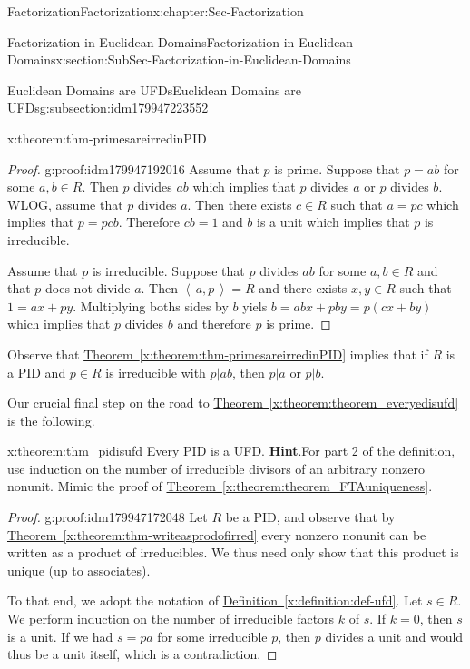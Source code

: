 \documentclass[oneside,10pt,]{book}
\newcommand{\blocktitlefont}{\relax}
\newcommand{\xreffont}{\relax}
\numberwithin{equation}{section}
\newcommand{\ideal}[1]{\left\langle\, #1 \,\right\rangle}
\begin{document}
\begin{chapterptx}{Factorization}{}{Factorization}{}{}{x:chapter:Sec-Factorization}
\begin{sectionptx}{Factorization in Euclidean Domains}{}{Factorization in Euclidean Domains}{}{}{x:section:SubSec-Factorization-in-Euclidean-Domains}
\begin{subsectionptx}{Euclidean Domains are UFDs}{}{Euclidean Domains are UFDs}{}{}{g:subsection:idm179947223552}
\begin{theorem}{}{}{x:theorem:thm-primesareirredinPID}
\end{theorem}
\begin{proof}{}{g:proof:idm179947192016}
Assume that \(p\) is prime. Suppose that \(p=ab\) for some \(a,b \in R\). Then \(p\) divides \(ab\) which implies that \(p\) divides \(a\) or \(p\) divides \(b\). WLOG, assume that \(p\) divides \(a\). Then there exists \(c\in R\) such that \(a=pc\) which implies that \(p=pcb\). Therefore \(cb=1\) and \(b\) is a unit which implies that \(p\) is irreducible.%
\par
Assume that \(p\) is irreducible. Suppose that \(p\) divides \(ab\) for some \(a,b \in R\) and that \(p\) does not divide \(a\). Then \(\ideal{a,p}=R\) and there exists \(x,y\in R\) such that \(1=ax+py\). Multiplying boths sides by \(b\) yiels \(b=abx+pby=p(cx+by)\) which implies that \(p\) divides \(b\) and therefore \(p\) is prime.%
\end{proof}
Observe that \hyperref[x:theorem:thm-primesareirredinPID]{Theorem~{\xreffont\ref{x:theorem:thm-primesareirredinPID}}} implies that if \(R\) is a PID and \(p\in R\) is irreducible with \(p|ab\), then \(p|a\) or \(p|b\).%
\par
Our crucial final step on the road to \hyperref[x:theorem:theorem_everyedisufd]{Theorem~{\xreffont\ref{x:theorem:theorem_everyedisufd}}} is the following.%
\begin{theorem}{}{}{x:theorem:thm_pidisufd}%
Every PID is a UFD.%
\textbf{\blocktitlefont Hint}.\quad{}For part 2 of the definition, use induction on the number of irreducible divisors of an arbitrary nonzero nonunit. Mimic the proof of \hyperref[x:theorem:theorem_FTAuniqueness]{Theorem~{\xreffont\ref{x:theorem:theorem_FTAuniqueness}}}.\end{theorem}
\begin{proof}{}{g:proof:idm179947172048}
Let \(R\) be a PID, and observe that by \hyperref[x:theorem:thm-writeasprodofirred]{Theorem~{\xreffont\ref{x:theorem:thm-writeasprodofirred}}} every nonzero nonunit can be written as a product of irreducibles. We thus need only show that this product is unique (up to associates).%
\par
To that end, we adopt the notation of \hyperref[x:definition:def-ufd]{Definition~{\xreffont\ref{x:definition:def-ufd}}}. Let \(s\in R\). We perform induction on the number of irreducible factors \(k\) of \(s\). If \(k=0\), then \(s\) is a unit. If we had \(s = pa\) for some irreducible \(p\), then \(p\) divides a unit and would thus be a unit itself, which is a contradiction.%
\par

\end{proof}
\end{subsectionptx}
\end{sectionptx}
\end{chapterptx}
\end{document}
